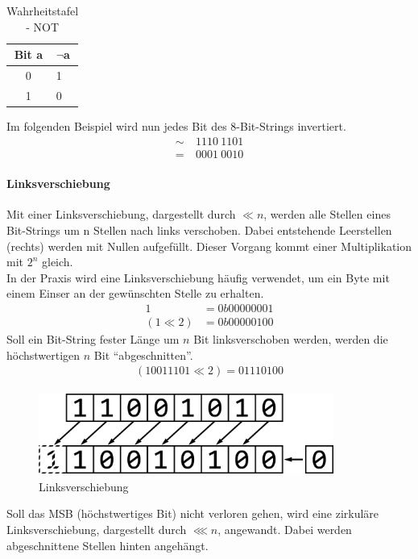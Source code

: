 \documentclass[12pt,a4paper]{scrartcl}
\numberwithin{equation}{section}
\numberwithin{myalgctr}{section}
\numberwithin{mytheoremctr}{section}
\newcommand*\BitNeg{\ensuremath{\mathord{\sim}}}
\newcommand{\mpar}[1]{\paragraph*{#1}\mbox{}\par}
\begin{document}
	\begin{table}[h!]
		\centering
		\begin{tabular}{|c|l|}
			\hline
			\rowcolor[HTML]{C0C0C0} 
			{\color[HTML]{000000} Bit a}  & {\color[HTML]{000000} $\neg$a} \\ \hline
			\rowcolor[HTML]{EFEFEF} 
			0                            & 1                            
			\\ \hline
			\rowcolor[HTML]{EFEFEF} 
			1                            & 0                                                  
			\\ \hline
		\end{tabular}
		\caption{Wahrheitstafel - NOT}
	\end{table}\noindent
Im folgenden Beispiel wird nun jedes Bit des 8-Bit-Strings invertiert.
\begin{align*}
	\BitNeg~&1110~1101\\
	=~&0001~0010
\end{align*}
	\mpar{Linksverschiebung}\noindent
	Mit einer Linksverschiebung, dargestellt durch $\ll n$, werden alle Stellen eines Bit-Strings um n Stellen nach links verschoben. Dabei entstehende Leerstellen (rechts) werden mit Nullen aufgefüllt. Dieser Vorgang kommt einer Multiplikation mit $2^n$ gleich.\\	
	In der Praxis wird eine Linksverschiebung häufig verwendet, um ein Byte mit einem Einser an der gewünschten Stelle zu erhalten.
	\begin{align*}
	1&=0b00000001\\
	(1\ll 2)&=0b00000100
	\end{align*}
	Soll ein Bit-String fester Länge um $n$ Bit linksverschoben werden,	werden die höchstwertigen $n$ Bit \textquotedblleft abgeschnitten\textquotedblright.
	\begin{align*}
	(10011101\ll 2)=01110100
	\end{align*}
	
	\begin{figure}[!h]
		\vspace{.25cm}
		\centering
		\includegraphics[width=9.69cm,height=2.75cm]{leftshift}
		\caption{Linksverschiebung} %
		\label{fig:leftshift}
	\end{figure}
	\noindent
	Soll das MSB (höchstwertiges Bit) nicht verloren gehen, wird eine zirkuläre Linksverschiebung, dargestellt durch $\lll n$, angewandt. Dabei werden abgeschnittene Stellen hinten angehängt.
	
\end{document}
